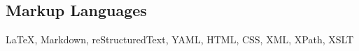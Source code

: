 
\subsection{Markup Languages}

\LaTeX, Markdown, reStructuredText, YAML, HTML, CSS, XML, XPath, XSLT
